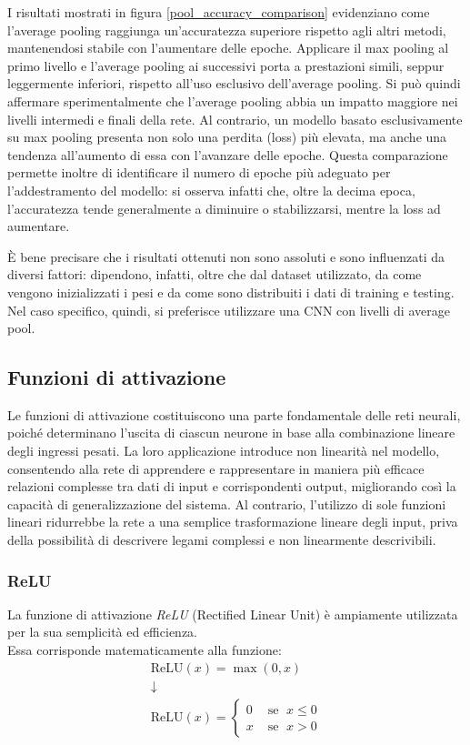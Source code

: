 \documentclass[a4paper,12pt]{article}
\begin{document}
I risultati mostrati in figura \ref{pool_accuracy_comparison} evidenziano come l'average pooling raggiunga un'accuratezza superiore rispetto agli altri metodi, mantenendosi stabile con l'aumentare delle epoche.
Applicare il max pooling al primo livello e l'average pooling ai successivi porta a prestazioni simili, seppur leggermente inferiori, rispetto all'uso esclusivo dell'average pooling. Si può quindi affermare sperimentalmente che l'average pooling abbia un impatto maggiore nei livelli intermedi e finali della rete.
Al contrario, un modello basato esclusivamente su max pooling presenta non solo una perdita (loss) più elevata, ma anche una tendenza all'aumento di essa con l'avanzare delle epoche. Questa comparazione permette inoltre di identificare il numero di epoche più adeguato per l'addestramento del modello: si osserva infatti che, oltre la decima epoca, l'accuratezza tende generalmente a diminuire o stabilizzarsi, mentre la loss ad aumentare.

È bene precisare che i risultati ottenuti non sono assoluti e sono influenzati da diversi fattori: dipendono, infatti, oltre che dal dataset utilizzato, da come vengono inizializzati i pesi e da come sono distribuiti i dati di training e testing. Nel caso specifico, quindi, si preferisce utilizzare una CNN con livelli di average pool.

\subsection{Funzioni di attivazione}
Le funzioni di attivazione costituiscono una parte fondamentale delle reti neurali, poiché determinano l'uscita di ciascun neurone in base alla combinazione lineare degli ingressi pesati. La loro applicazione introduce non linearità nel modello, consentendo alla rete di apprendere e rappresentare in maniera più efficace relazioni complesse tra dati di input e corrispondenti output, migliorando così la capacità di generalizzazione del sistema.  
Al contrario, l'utilizzo di sole funzioni lineari ridurrebbe la rete a una semplice trasformazione lineare degli input, priva della possibilità di descrivere legami complessi e non linearmente descrivibili.

\subsubsection{ReLU}
La funzione di attivazione \textit{ReLU} (Rectified Linear Unit) è ampiamente utilizzata per la sua semplicità ed efficienza.\\
Essa corrisponde matematicamente alla funzione:
\begin{gather*}
    \text{ReLU}(x) = \max (0, x) \\
    \downarrow \\
    \text{ReLU}(x) =
        \begin{cases}
            0 & \text{ se } \; x\leq 0 \\
            x & \text{ se } \; x > 0 
        \end{cases}
\end{gather*}
\end{document}
